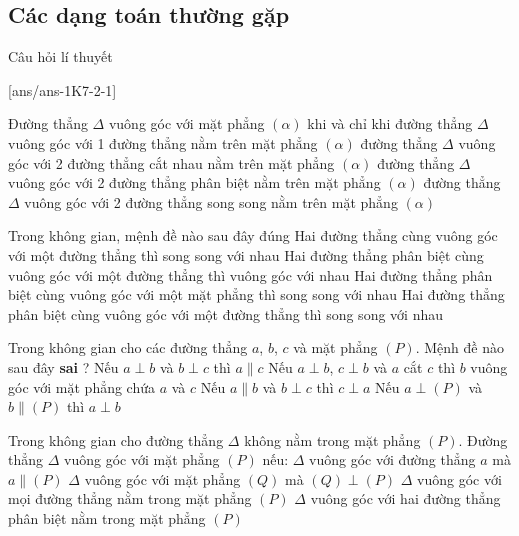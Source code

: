 \subsection{Các dạng toán thường gặp}
\begin{dang}{Câu hỏi lí thuyết}
\end{dang}
[ans/ans-1K7-2-1]
\begin{ex}%
	Đường thẳng $\Delta$ vuông góc với mặt phẳng $(\alpha)$ khi và chỉ khi
	\choice
	{đường thẳng $\Delta$ vuông góc với 1 đường thẳng nằm trên mặt phẳng $(\alpha)$}
	{\True đường thẳng $\Delta$ vuông góc với 2 đường thẳng cắt nhau nằm trên mặt phẳng $(\alpha)$}
	{đường thẳng $\Delta$ vuông góc với 2 đường thẳng phân biệt nằm trên mặt phẳng $(\alpha)$}
	{đường thẳng $\Delta$ vuông góc với 2 đường thẳng song song nằm trên mặt phẳng $(\alpha)$}
\end{ex}
\begin{ex}%
	Trong không gian, mệnh đề nào sau đây đúng
	\choice
	{Hai đường thẳng cùng vuông góc với một đường thẳng thì song song với nhau}
	{Hai đường thẳng phân biệt cùng vuông góc với một đường thẳng thì vuông góc với nhau}
	{\True Hai đường thẳng phân biệt cùng vuông góc với một mặt phẳng thì song song với nhau}
	{Hai đường thẳng phân biệt cùng vuông góc với một đường thẳng thì song song với nhau}
\end{ex}
\begin{ex}%
	Trong không gian cho các đường thẳng $ a $, $ b $, $ c $ và mặt phẳng $(P)$. Mệnh đề nào sau đây \textbf{sai} ?
	\choice
	{\True Nếu $ a \perp b $ và $ b \perp c $ thì $ a\parallel c $}
	{Nếu $ a \perp b $, $ c \perp b $ và $ a $ cắt $ c $ thì $ b $ vuông góc với mặt phẳng chứa $ a $ và $ c $}
	{Nếu $ a \parallel b $ và $ b \perp c $ thì $ c \perp a $}
	{Nếu $ a \perp (P) $ và $ b \parallel (P)$ thì $ a \perp b $}
\end{ex}
\begin{ex}%
	Trong không gian cho đường thẳng $ \Delta $ không nằm trong mặt phẳng $ (P) $. Đường thẳng $ \Delta $ vuông góc với mặt phẳng $ (P) $ nếu:
	\choice
	{$ \Delta $ vuông góc với đường thẳng $ a $ mà $ a \parallel (P) $}
	{$ \Delta $ vuông góc với mặt phẳng $ (Q) $ mà $ (Q) \perp (P) $}
	{\True$ \Delta $ vuông góc với mọi đường thẳng nằm trong mặt phẳng $ (P) $}
	{$ \Delta $ vuông góc với hai đường thẳng phân biệt nằm trong mặt phẳng $ (P) $}
\end{ex}

